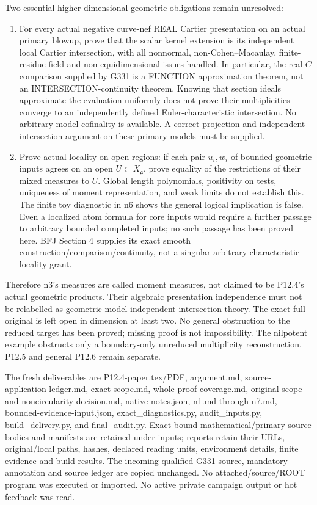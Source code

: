\documentclass[
  11pt,
]{article}
\begin{document}
Two essential higher-dimensional geometric obligations remain
unresolved:

\begin{enumerate}
\def\labelenumi{\arabic{enumi}.}
\item
  For every actual negative curve-nef REAL Cartier presentation on an
  actual primary blowup, prove that the scalar kernel extension is its
  independent local Cartier intersection, with all nonnormal,
  non-Cohen--Macaulay, finite-residue-field and non-equidimensional
  issues handled. In particular, the real \(C\) comparison supplied by
  G331 is a FUNCTION approximation theorem, not an
  INTERSECTION-continuity theorem. Knowing that section ideals
  approximate the evaluation uniformly does not prove their
  multiplicities converge to an independently defined
  Euler-characteristic intersection. No arbitrary-model cofinality is
  available. A correct projection and independent-intersection argument
  on these primary models must be supplied.
\item
  Prove actual locality on open regions: if each pair \(u_i,w_i\) of
  bounded geometric inputs agrees on an open
  \(U\subset X_{\mathfrak a}\), prove equality of the restrictions of
  their mixed measures to \(U\). Global length polynomials, positivity
  on tests, uniqueness of moment representation, and weak limits do not
  establish this. The finite toy diagnostic in n6 shows the general
  logical implication is false. Even a localized atom formula for core
  inputs would require a further passage to arbitrary bounded completed
  inputs; no such passage has been proved here. BFJ Section 4 supplies
  its exact smooth construction/comparison/continuity, not a singular
  arbitrary-characteristic locality grant.
\end{enumerate}

Therefore n3's measures are called moment measures, not claimed to be
P12.4's actual geometric products. Their algebraic presentation
independence must not be relabelled as geometric model-independent
intersection theory. The exact full original is left open in dimension
at least two. No general obstruction to the reduced target has been
proved; missing proof is not impossibility. The nilpotent example
obstructs only a boundary-only unreduced multiplicity reconstruction.
P12.5 and general P12.6 remain separate.

The fresh deliverables are P12.4-paper.tex/PDF, argument.md,
source-application-ledger.md, exact-scope.md, whole-proof-coverage.md,
original-scope-and-noncircularity-decision.md, native-notes.json, n1.md
through n7.md, bounded-evidence-input.json, exact\_diagnostics.py,
audit\_inputs.py, build\_delivery.py, and final\_audit.py. Exact bound
mathematical/primary source bodies and manifests are retained under
inputs; reports retain their URLs, original/local paths, hashes,
declared reading units, environment details, finite evidence and build
results. The incoming qualified G331 source, mandatory annotation and
source ledger are copied unchanged. No attached/source/ROOT program was
executed or imported. No active private campaign output or hot feedback
was read.
\end{document}

